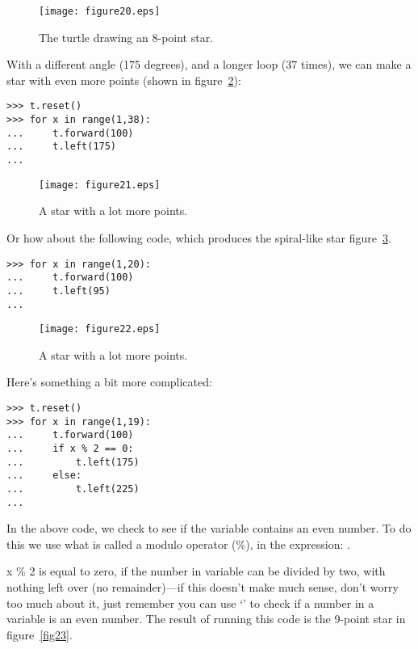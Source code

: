 \begin{figure}
\begin{center}
\texttt{[image: figure20.eps]}
\end{center}
\caption{The turtle drawing an 8-point star.}\label{fig20}
\end{figure}

\noindent
With a different angle (175 degrees), and a longer loop (37 times), we can make a star with even more points (shown in figure~\ref{fig21}):

\begin{Verbatim}[frame=single]
>>> t.reset()
>>> for x in range(1,38):
...     t.forward(100)
...     t.left(175)
...
\end{Verbatim}

\begin{figure}
\begin{center}
\texttt{[image: figure21.eps]}
\end{center}
\caption{A star with a lot more points.}\label{fig21}
\end{figure}

\noindent
Or how about the following code, which produces the spiral-like star figure~\ref{fig22}.

\begin{Verbatim}[frame=single]
>>> for x in range(1,20):
...     t.forward(100)
...     t.left(95)
...
\end{Verbatim}

\begin{figure}
\begin{center}
\texttt{[image: figure22.eps]}
\end{center}
\caption{A star with a lot more points.}\label{fig22}
\end{figure}

\noindent
Here's something a bit more complicated:

\begin{Verbatim}[frame=single]
>>> t.reset()
>>> for x in range(1,19):
...     t.forward(100)
...     if x % 2 == 0:
...         t.left(175)
...     else:
...         t.left(225)
...
\end{Verbatim}

In the above code, we check to see if the variable  contains an even number.  To do this we use what is called a modulo operator (\%), in the expression: .
\par
x \% 2 is equal to zero, if the number in variable  can be divided by two, with nothing left over (no remainder)---if this doesn't make much sense, don't worry too much about it, just remember you can use `' to check if a number in a variable is an even number.  The result of running this code is the 9-point star in figure~\ref{fig23}.

